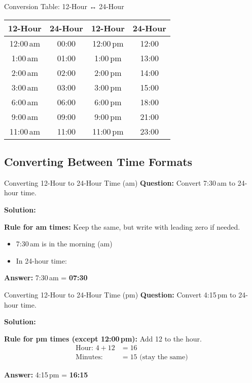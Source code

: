 \documentclass[12pt,a4paper]{article}
\begin{document}
\begin{conceptbox}{Conversion Table: 12-Hour ↔ 24-Hour}
\begin{center}
\begin{tabular}{cc|cc}
\toprule
\textbf{12-Hour} & \textbf{24-Hour} & \textbf{12-Hour} & \textbf{24-Hour} \\
\midrule
12:00\,am & 00:00 & 12:00\,pm & 12:00 \\
1:00\,am & 01:00 & 1:00\,pm & 13:00 \\
2:00\,am & 02:00 & 2:00\,pm & 14:00 \\
3:00\,am & 03:00 & 3:00\,pm & 15:00 \\
6:00\,am & 06:00 & 6:00\,pm & 18:00 \\
9:00\,am & 09:00 & 9:00\,pm & 21:00 \\
11:00\,am & 11:00 & 11:00\,pm & 23:00 \\
\bottomrule
\end{tabular}
\end{center}
\end{conceptbox}

\subsection{Converting Between Time Formats}

\begin{examplebox}{Converting 12-Hour to 24-Hour Time (am)}
\textbf{Question:} Convert 7:30\,am to 24-hour time.

\textbf{Solution:}

\textbf{Rule for am times:} Keep the same, but write with leading zero if needed.
\begin{itemize}
\item 7:30\,am is in the morning (am)
\item In 24-hour time: 
\end{itemize}

\textbf{Answer:} 7:30\,am = \textbf{07:30}
\end{examplebox}

\begin{examplebox}{Converting 12-Hour to 24-Hour Time (pm)}
\textbf{Question:} Convert 4:15\,pm to 24-hour time.

\textbf{Solution:}

\textbf{Rule for pm times (except 12:00\,pm):} Add 12 to the hour.
\begin{align*}
\text{Hour: } 4 + 12 &= 16 \\
\text{Minutes: } &= 15 \text{ (stay the same)}
\end{align*}

\textbf{Answer:} 4:15\,pm = \textbf{16:15}
\end{examplebox}
\end{document}
